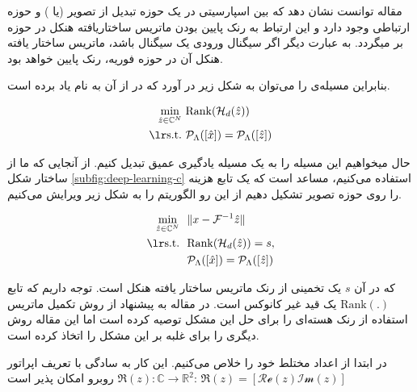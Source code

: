 مقاله \cite{Jin_2016}
توانست نشان دهد که بین اسپارسیتی در یک حوزه تبدیل از تصویر (یا
)
و حوزه \kspace ارتباطی وجود دارد و این ارتباط به رنک پایین بودن
ماتریس ساختاریافته هنکل
در حوزه \kspace بر میگردد. به عبارت دیگر اگر سیگنال ورودی یک سیگنال  باشد، ماتریس ساختار یافته هنکل آن در حوزه فوریه، رنک پایین خواهد بود.

بنابراین مسیله‌ی 
را می‌توان به شکل زیر در آورد که در \cite{Jin_2016} از آن به نام  یاد برده است.



\removevspace
\begin{subequations}
	\begin{align}
		\min_{\hat{z}\in\mathbb{C}^N} \ &\mathrm{Rank}(\mathcal{H}_d(\hat{z})) \\
		\lrtext{s.t.} \ & \Rho_\Lambda([\hat{x}]) = \Rho_\Lambda([\hat{z}])
	\end{align}
\end{subequations}


حال میخواهیم این مسيله را به یک مسیله یادگیری عمیق 
تبدیل کنیم. از آنجایی که ما از ساختار شکل \ref{subfig:deep-learning-c}
استفاده می‌کنیم، مساعد است که یک تابع هزینه را روی حوزه تصویر تشکیل دهیم از این رو الگوریتم  را به شکل زیر ویرایش می‌کنیم.


\begin{subequations}\label{eq:aloha-modify1}
	\begin{align}
		\min_{\hat{z}\in\mathbb{C}^N} \ \  & \| x - \F^{-1}{\hat{z}}\| \\
		\lrtext{s.t.} \ \  & \mathrm{Rank}(\mathcal{H}_d(\hat{z})) = s, \\
		& \Rho_\Lambda([\hat{x}]) = \Rho_\Lambda([\hat{z}])
	\end{align}
\end{subequations}

که در آن $s$ یک تخمینی از رنک ماتریس ساختار یافته هنکل است. توجه داریم که تابع
$\mathrm{Rank}(.)$
یک قید غیر کانوکس 
است. در مقاله \cite{Jin_2016}
به پیشنهاد از روش تکمیل ماتریس 
\cite{Cand_s_2009}
استفاده از رنک هسته‌ای
را برای حل این مشکل توصیه کرده است اما این مقاله روش دیگری را برای غلبه بر این مشکل را اتخاذ کرده است. 

در ابتدا از اعداد مختلط خود را خلاص می‌کنیم. این کار به سادگی با تعریف اپراتور $\Re(z): \mathbb{C}\rightarrow\mathbb{R}^2$
روبرو امکان پذیر است:
$\Re(z) = [\mathcal{Re}(z) \mathcal{Im}(z)]$

